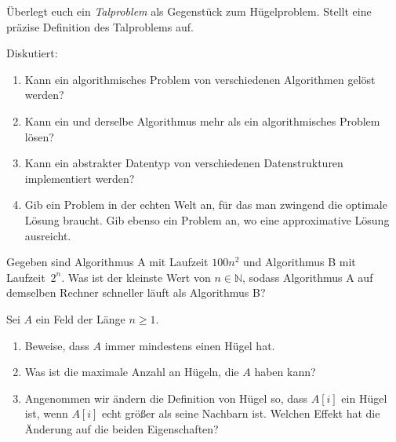 \documentclass{uebung_cs}
\begin{document}
\begin{aufgabe}[Täler]
	Überlegt euch ein \emph{Talproblem} als Gegenstück zum Hügelproblem.
	Stellt eine präzise Definition des Talproblems auf.
\end{aufgabe}

\begin{aufgabe} Diskutiert:
	\begin{enumerate}
		\item Kann ein algorithmisches Problem von verschiedenen Algorithmen gelöst werden?
		\item Kann ein und derselbe Algorithmus mehr als ein algorithmisches Problem lösen?
		\item Kann ein abstrakter Datentyp von verschiedenen Datenstrukturen implementiert werden?
		\item Gib ein Problem in der echten Welt an, für das man zwingend die optimale Lösung braucht. Gib ebenso ein Problem an, wo eine approximative Lösung ausreicht.
	\end{enumerate}	
\end{aufgabe}

\begin{aufgabe}
	Gegeben sind Algorithmus A mit Laufzeit $100n^2$ und Algorithmus B mit Laufzeit~$2^n$.
	Was ist der kleinste Wert von $n\in\mathbb{N}$, sodass Algorithmus A auf demselben Rechner schneller läuft als Algorithmus B?
\end{aufgabe}

\begin{aufgabe}[Hügeleigenschaften]
	Sei $A$ ein Feld der Länge $n\ge 1$.
	\begin{enumerate}
		\item Beweise, dass $A$ immer mindestens einen Hügel hat.
		\item Was ist die maximale Anzahl an Hügeln, die $A$ haben kann?
		\item Angenommen wir ändern die Definition von Hügel so, dass $A[i]$ ein Hügel ist, wenn $A[i]$ echt größer als seine Nachbarn ist. Welchen Effekt hat die Änderung auf die beiden Eigenschaften?
	\end{enumerate}
\end{aufgabe}
\end{document}
